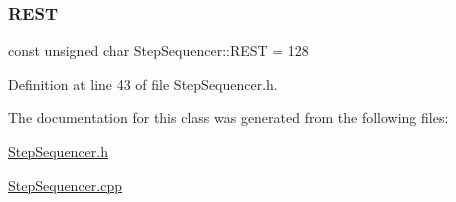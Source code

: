 \subsubsection{\texorpdfstring{R\+E\+ST}{REST}}
{\footnotesize\ttfamily const unsigned char Step\+Sequencer\+::\+R\+E\+ST = 128\hspace{0.3cm}{\ttfamily [static]}}



Definition at line 43 of file Step\+Sequencer.\+h.



The documentation for this class was generated from the following files\+:\begin{DoxyCompactItemize}
\item 
\hyperlink{_step_sequencer_8h}{Step\+Sequencer.\+h}\item 
\hyperlink{_step_sequencer_8cpp}{Step\+Sequencer.\+cpp}\end{DoxyCompactItemize}
